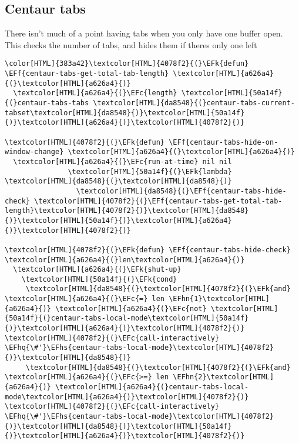 \documentclass{scrartcl}
\newcommand{\EFk}[1]{\textcolor{EFk}{#1}} %
\newcommand{\EFc}[1]{\textcolor{EFc}{#1}} %
\newcommand{\EFf}[1]{\textcolor{EFf}{#1}} %
\newcommand{\EFhn}[1]{\textcolor{EFhn}{\textbf{#1}}} %
\newcommand{\EFhq}[1]{\textcolor{EFhq}{#1}} %
\newcommand{\EFhs}[1]{\textcolor{EFhs}{#1}} %
\begin{document}
\subsection{Centaur tabs}
\label{sec:orgdb5f243}
There isn't much of a point having tabs when you only have one buffer open. This checks the number of tabs, and hides them if theres only one left
\begin{Code}
\begin{Verbatim}[]
\color[HTML]{383a42}\textcolor[HTML]{4078f2}{(}\EFk{defun} \EFf{centaur-tabs-get-total-tab-length} \textcolor[HTML]{a626a4}{(}\textcolor[HTML]{a626a4}{)}
  \textcolor[HTML]{a626a4}{(}\EFc{length} \textcolor[HTML]{50a14f}{(}centaur-tabs-tabs \textcolor[HTML]{da8548}{(}centaur-tabs-current-tabset\textcolor[HTML]{da8548}{)}\textcolor[HTML]{50a14f}{)}\textcolor[HTML]{a626a4}{)}\textcolor[HTML]{4078f2}{)}

\textcolor[HTML]{4078f2}{(}\EFk{defun} \EFf{centaur-tabs-hide-on-window-change} \textcolor[HTML]{a626a4}{(}\textcolor[HTML]{a626a4}{)}
  \textcolor[HTML]{a626a4}{(}\EFc{run-at-time} nil nil
               \textcolor[HTML]{50a14f}{(}\EFk{lambda} \textcolor[HTML]{da8548}{(}\textcolor[HTML]{da8548}{)}
                 \textcolor[HTML]{da8548}{(}\EFf{centaur-tabs-hide-check} \textcolor[HTML]{4078f2}{(}\EFf{centaur-tabs-get-total-tab-length}\textcolor[HTML]{4078f2}{)}\textcolor[HTML]{da8548}{)}\textcolor[HTML]{50a14f}{)}\textcolor[HTML]{a626a4}{)}\textcolor[HTML]{4078f2}{)}

\textcolor[HTML]{4078f2}{(}\EFk{defun} \EFf{centaur-tabs-hide-check} \textcolor[HTML]{a626a4}{(}len\textcolor[HTML]{a626a4}{)}
  \textcolor[HTML]{a626a4}{(}\EFk{shut-up}
    \textcolor[HTML]{50a14f}{(}\EFk{cond}
     \textcolor[HTML]{da8548}{(}\textcolor[HTML]{4078f2}{(}\EFk{and} \textcolor[HTML]{a626a4}{(}\EFc{=} len \EFhn{1}\textcolor[HTML]{a626a4}{)} \textcolor[HTML]{a626a4}{(}\EFc{not} \textcolor[HTML]{50a14f}{(}centaur-tabs-local-mode\textcolor[HTML]{50a14f}{)}\textcolor[HTML]{a626a4}{)}\textcolor[HTML]{4078f2}{)} \textcolor[HTML]{4078f2}{(}\EFc{call-interactively} \EFhq{\#'}\EFhs{centaur-tabs-local-mode}\textcolor[HTML]{4078f2}{)}\textcolor[HTML]{da8548}{)}
     \textcolor[HTML]{da8548}{(}\textcolor[HTML]{4078f2}{(}\EFk{and} \textcolor[HTML]{a626a4}{(}\EFc{>=} len \EFhn{2}\textcolor[HTML]{a626a4}{)} \textcolor[HTML]{a626a4}{(}centaur-tabs-local-mode\textcolor[HTML]{a626a4}{)}\textcolor[HTML]{4078f2}{)} \textcolor[HTML]{4078f2}{(}\EFc{call-interactively} \EFhq{\#'}\EFhs{centaur-tabs-local-mode}\textcolor[HTML]{4078f2}{)}\textcolor[HTML]{da8548}{)}\textcolor[HTML]{50a14f}{)}\textcolor[HTML]{a626a4}{)}\textcolor[HTML]{4078f2}{)}
\end{Verbatim}
\end{Code}
\end{document}
